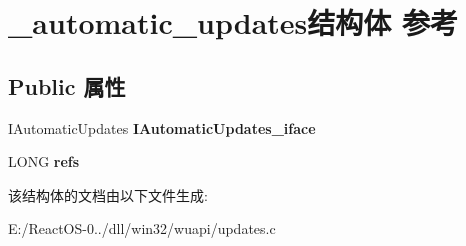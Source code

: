 \hypertarget{struct__automatic__updates}{}\section{\+\_\+automatic\+\_\+updates结构体 参考}
\label{struct__automatic__updates}
\subsection*{Public 属性}
\begin{DoxyCompactItemize}
\item 
\mbox{\label{struct__automatic__updates_a1bb7c96b01660c7f9b4b8beb3e52a7b7}} 
I\+Automatic\+Updates {\bfseries I\+Automatic\+Updates\+\_\+iface}
\item 
\mbox{\label{struct__automatic__updates_a684de8625b508758b84b1a6cd95cc4fe}} 
L\+O\+NG {\bfseries refs}
\end{DoxyCompactItemize}


该结构体的文档由以下文件生成\+:\begin{DoxyCompactItemize}
\item 
E\+:/\+React\+O\+S-\/0../dll/win32/wuapi/updates.\+c\end{DoxyCompactItemize}
